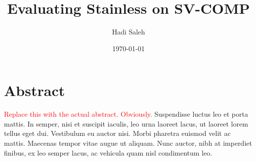 \documentclass[11pt,titlepage,openright]{book}
\newcommand{\RED}[1]{\textcolor{red}{#1}}
\begin{document}
\frontmatter
\title{Evaluating Stainless on SV-COMP}
\author{Hadi Saleh}
\date{\today}

\maketitle

\vspace*{3cm}
\section*{Abstract}

\RED{Replace this with the actual abstract. Obviously.}
Suspendisse luctus leo et porta mattis. In semper, nisi et
suscipit iaculis, leo urna laoreet lacus, ut laoreet lorem tellus
eget dui. Vestibulum eu auctor nisi. Morbi pharetra euismod velit
ac mattis. Maecenas tempor vitae augue ut aliquam. Nunc auctor,
nibh at imperdiet finibus, ex leo semper lacus, ac vehicula quam
nisl condimentum leo.


\tableofcontents
\listoffigures
\listoftables

\mainmatter
\end{document}
